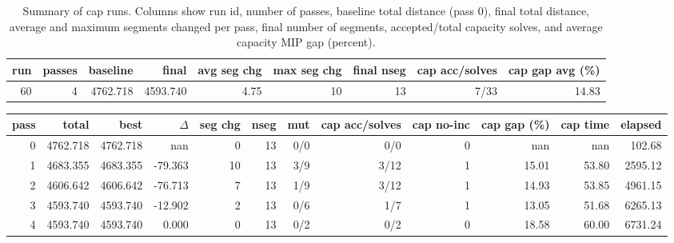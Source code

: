 \begin{table}[ht]
\centering
\caption{Summary of cap runs. Columns show run id, number of passes, baseline total distance (pass 0), final total distance, average and maximum segments changed per pass, final number of segments, accepted/total capacity solves, and average capacity MIP gap (percent).}
\begin{tabular}{r r r r r r r r r}
\hline
run & passes & baseline & final & avg seg chg & max seg chg & final nseg & cap acc/solves & cap gap avg (\%) \\
\hline
60 & 4 & 4762.718 & 4593.740 & 4.75 & 10 & 13 & 7/33 & 14.83 \\
\hline
\end{tabular}
\end{table}

\begin{tabular}{r r r r r r r r r r r r}
\hline
pass & total & best & $\Delta$ & seg chg & nseg & mut & cap acc/solves & cap no-inc & cap gap (\%) & cap time & elapsed \\
\hline
0 & 4762.718 & 4762.718 & nan & 0 & 13 & 0/0 & 0/0 & 0 & nan & nan & 102.68 \\
1 & 4683.355 & 4683.355 & -79.363 & 10 & 13 & 3/9 & 3/12 & 1 & 15.01 & 53.80 & 2595.12 \\
2 & 4606.642 & 4606.642 & -76.713 & 7 & 13 & 1/9 & 3/12 & 1 & 14.93 & 53.85 & 4961.15 \\
3 & 4593.740 & 4593.740 & -12.902 & 2 & 13 & 0/6 & 1/7 & 1 & 13.05 & 51.68 & 6265.13 \\
4 & 4593.740 & 4593.740 & 0.000 & 0 & 13 & 0/2 & 0/2 & 0 & 18.58 & 60.00 & 6731.24 \\
\hline
\end{tabular}
